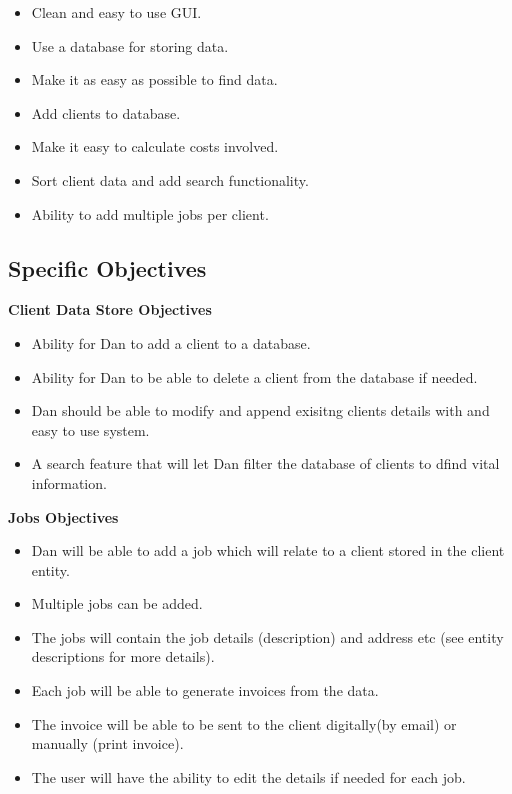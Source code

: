 	\begin{itemize}
		\item Clean and easy to use GUI.
		\item Use a database for storing data.
		\item Make it as easy as possible to find data.
		\item Add clients to database.
		\item Make it easy to calculate costs involved.
		\item Sort client data and add search functionality.
		\item Ability to add multiple jobs per client.
	\end{itemize}

\subsection{Specific Objectives}
	
	\textbf{Client Data Store Objectives}
	\begin{itemize}
		\item Ability for Dan to add a client to a database.
		\item Ability for Dan to be able to delete a client from the database if needed.
		\item Dan should be able to modify and append exisitng clients details with and easy to use system.
		\item A search feature that will let Dan filter the database of clients to dfind vital information.

	\end{itemize}
	
	\textbf{Jobs Objectives}
	\begin{itemize}
		\item Dan will be able to add a job which will relate to a client stored in the client entity.
		\item Multiple jobs can be added.
		\item The jobs will contain the job details (description) and address etc (see entity descriptions for more details).
		\item Each job will be able to generate invoices from the data.
		\item The invoice will be able to be sent to the client digitally(by email) or manually (print invoice).
		\item The user will have the ability to edit the details if needed for each job.
	
	\end{itemize}
	
